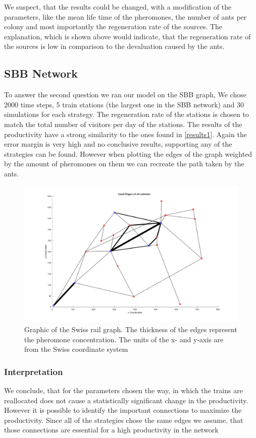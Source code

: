 We suspect, that the results could be changed, with a modification of the parameters, like the mean life time of the pheromones, the number of ants per colony and most importantly the regeneration rate of the sources. The explanation, which is shown above would indicate, that the regeneration rate of the sources is low in comparison to the devaluation caused by the ants.

\subsection{SBB Network}
To answer the second question we ran our model on the SBB graph, We chose 2000 time steps, 5 train stations (the largest one in the SBB network) and 30 simulations for each strategy. The regeneration rate of the stations is chosen to match the total number of visitors per day of the stations. The results of the productivity have a strong similarity to the ones found in \ref{results1}. Again the error margin is very high and no conclusive results, supporting any of the strategies can be found. However when plotting the edges of the graph weighted by the amount of pheromones on them we can recreate the path taken by the ants.
\begin{figure}[H]
	\centering
	\includegraphics[scale=0.7]{sbbWeighted.pdf}
	\caption{Graphic of the Swiss rail graph. The thickness of the edges represent the pheromone concentration. The units of the x- and y-axis are from the Swiss coordinate system}
\end{figure}

\subsubsection{Interpretation}
We conclude, that for the parameters chosen the way, in which the trains are reallocated does not cause a statistically significant change in the productivity. However it is possible to identify the important connections to maximize the productivity. Since all of the strategies chose the same edges we assume, that those connections are essential for a high productivity in the network